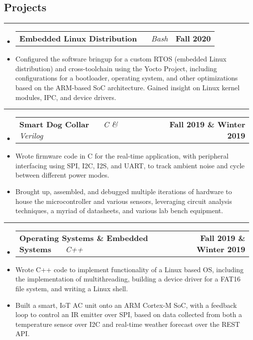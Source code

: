 \documentclass[10pt,letterpaper]{article}
\makeatletter
\newcommand{\header}[2]
{
	\begin{tabular*}{\linewidth}{l @{\extracolsep{\fill}} r}
		\hspace{-27pt} #1 & #2 \\
	\end{tabular*}
}
\newcommand{\sectionbreak}
{
	\vspace{-1.2em}
	\rule{\textwidth}{1.7pt}
	\vspace{-1.7em}
}
\makeatother
\begin{document}
\vspace{-1.5em}

\subsection*{Projects}
\sectionbreak

\begin{itemize}
	\item[]
		\header
		{
			\textbf{Embedded Linux Distribution}
			\emph{\smash{Personal Project}} \ \ \ \footnotesize \emph{Bash}
		}
		{\textbf{Fall 2020}}
	\item 
	Configured the software bringup for a custom RTOS (embedded Linux distribution) and cross-toolchain using the Yocto Project, including configurations for a bootloader, operating system, and other optimizations based on the ARM-based SoC architecture. Gained insight on Linux kernel modules, IPC, and device drivers. 


\end{itemize}

\hrule


\begin{itemize}
	\item[]
		\header
		{
			\textbf{Smart Dog Collar}
			\emph{\smash{Senior Design Project}} \ \ \ \footnotesize \emph{C \& Verilog}
		}
		{\textbf{Fall 2019 \& Winter 2019}}
	\item 
		Wrote firmware code in C for the real-time application, with peripheral interfacing using SPI, I2C, I2S, and UART, to track ambient noise and cycle between different power modes.
	\item 
		Brought up, assembled, and debugged multiple iterations of hardware to house the microcontroller and various sensors, leveraging circuit analysis techniques, a myriad of datasheets, and various lab bench equipment.

\end{itemize}

\hrule


\begin{itemize}
	\item[]
		\header
		{
			\textbf{Operating Systems \& Embedded Systems}
			\emph{\smash{Relevant Course Project}} \ \ \ \footnotesize \emph{C++}
		}
		{\textbf{Fall 2019 \& Winter 2019}}
	\item 
		Wrote C++ code to implement functionality of a Linux based OS, including the implementation of multithreading, building a device driver for a FAT16 file system, and writing a Linux shell.
	\item 
		Built a smart, IoT AC unit onto an ARM Cortex-M SoC, with a feedback loop to control an IR emitter over SPI, based on data collected from both a temperature sensor over I2C and real-time weather forecast over the REST API. 

\end{itemize}
\end{document}
